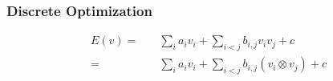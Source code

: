 \subsubsection{Discrete Optimization}

\begin{subequations}
\begin{align}
  \label{formula:dqm.form}
  E(v) =
  & \quad \sum_i a_i v_i + \sum_{i < j} b_{i, j} v_i v_j + c \\
  = & \quad \sum_i a_i v_i + \sum_{i < j} b_{i, j} \left( v_i \otimes v_j \right) + c
\end{align}
\end{subequations}

